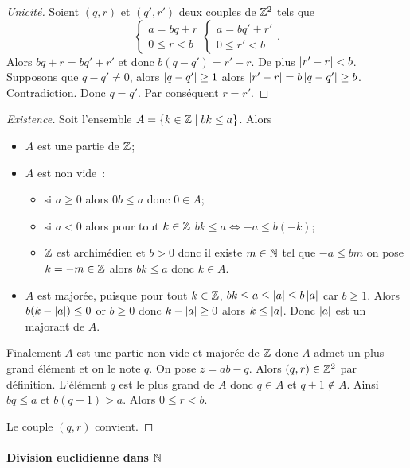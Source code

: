 \begin{proof}[Unicité]
  Soient $(q,r)$ et $(q',r')$ deux couples de $\mathbb{Z}^2$ tels que
  \begin{equation}
    \begin{cases}
      a=bq+r \\ 0 \leq r < b
    \end{cases}
    \begin{cases}
      a=bq'+r' \\ 0 \leq r' < b
    \end{cases}.
  \end{equation}
Alors $bq+r=bq'+r'$ et donc $b(q-q')=r'-r$. De plus $\left\lvert r'-r\right\rvert < b$. Supposons que $q-q' \neq 0$, alors $\left\lvert q-q'\right\rvert \geq 1$ alors $\left\lvert r'-r\right\rvert=b\left\lvert q-q'\right\rvert \geq b$. Contradiction. Donc $q=q'$. Par conséquent $r=r'$.
\end{proof}
\begin{proof}[Existence]
  Soit l'ensemble $A=\left\{k \in \mathbb{Z}\mathrel{}\middle|\mathrel{}bk \leq a\right\}$. Alors 
  \begin{itemize}
  \item $A$ est une partie de $\mathbb{Z}$;
  \item $A$ est non vide~:
    \begin{itemize}
    \item si $a \geq 0$ alors $0b \leq a$ donc $0 \in A$;
    \item si $a < 0$ alors pour tout $k \in \mathbb{Z}$ $bk \leq a \iff -a \leq b(-k)$;
    \item $\mathbb{Z}$ est archimédien et $b>0$ donc il existe $m \in \mathbb{N}$ tel que $-a \leq bm$ on pose $k=-m \in \mathbb{Z}$ alors $bk \leq a$ donc $k \in A$.
    \end{itemize}
  \item $A$ est majorée, puisque pour tout $k \in \mathbb{Z}$, $bk \leq a \leq \left\lvert a\right\rvert \leq b \left\lvert a\right\rvert$ car $b \geq 1$. Alors $b(k-\left\lvert a\right\rvert) \leq 0$ or $b \geq 0$ donc $k-\left\lvert a\right\rvert \geq 0$ alors $k \leq \left\lvert a\right\rvert$. Donc $\left\lvert a\right\rvert$ est un majorant de $A$.
  \end{itemize}

Finalement $A$ est une partie non vide et majorée de $\mathbb{Z}$ donc $A$ admet un plus grand élément et on le note $q$. On pose $z=ab-q$. Alors $(q,r) \in \mathbb{Z}^2$ par définition. L'élément $q$ est le plus grand de $A$ donc $q \in A$ et $q+1 \notin A$. Ainsi $bq \leq a$ et $b(q+1) > a$. Alors $0 \leq r < b$. 

Le couple $(q,r)$ convient.
\end{proof}

\paragraph{Division euclidienne dans $\mathbb{N}$}


